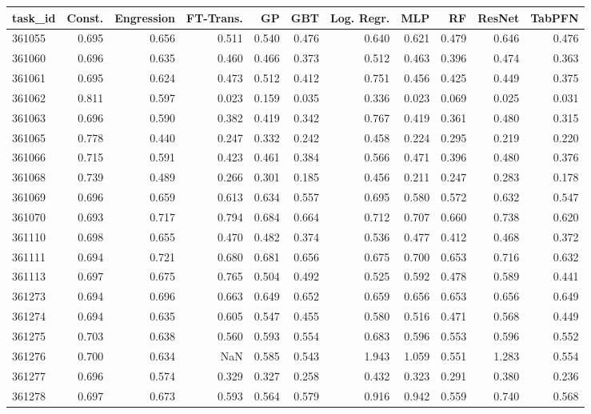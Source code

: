 \begin{tabular}{lrrrrrrrrrr}
\toprule
task\_id & Const. & Engression & FT-Trans. & GP & GBT & Log. Regr. & MLP & RF & ResNet & TabPFN \\
\midrule
361055 & 0.695 & 0.656 & 0.511 & 0.540 & 0.476 & 0.640 & 0.621 & 0.479 & 0.646 & 0.476 \\
361060 & 0.696 & 0.635 & 0.460 & 0.466 & 0.373 & 0.512 & 0.463 & 0.396 & 0.474 & 0.363 \\
361061 & 0.695 & 0.624 & 0.473 & 0.512 & 0.412 & 0.751 & 0.456 & 0.425 & 0.449 & 0.375 \\
361062 & 0.811 & 0.597 & 0.023 & 0.159 & 0.035 & 0.336 & 0.023 & 0.069 & 0.025 & 0.031 \\
361063 & 0.696 & 0.590 & 0.382 & 0.419 & 0.342 & 0.767 & 0.419 & 0.361 & 0.480 & 0.315 \\
361065 & 0.778 & 0.440 & 0.247 & 0.332 & 0.242 & 0.458 & 0.224 & 0.295 & 0.219 & 0.220 \\
361066 & 0.715 & 0.591 & 0.423 & 0.461 & 0.384 & 0.566 & 0.471 & 0.396 & 0.480 & 0.376 \\
361068 & 0.739 & 0.489 & 0.266 & 0.301 & 0.185 & 0.456 & 0.211 & 0.247 & 0.283 & 0.178 \\
361069 & 0.696 & 0.659 & 0.613 & 0.634 & 0.557 & 0.695 & 0.580 & 0.572 & 0.632 & 0.547 \\
361070 & 0.693 & 0.717 & 0.794 & 0.684 & 0.664 & 0.712 & 0.707 & 0.660 & 0.738 & 0.620 \\
361110 & 0.698 & 0.655 & 0.470 & 0.482 & 0.374 & 0.536 & 0.477 & 0.412 & 0.468 & 0.372 \\
361111 & 0.694 & 0.721 & 0.680 & 0.681 & 0.656 & 0.675 & 0.700 & 0.653 & 0.716 & 0.632 \\
361113 & 0.697 & 0.675 & 0.765 & 0.504 & 0.492 & 0.525 & 0.592 & 0.478 & 0.589 & 0.441 \\
361273 & 0.694 & 0.696 & 0.663 & 0.649 & 0.652 & 0.659 & 0.656 & 0.653 & 0.656 & 0.649 \\
361274 & 0.694 & 0.635 & 0.605 & 0.547 & 0.455 & 0.580 & 0.516 & 0.471 & 0.568 & 0.449 \\
361275 & 0.703 & 0.638 & 0.560 & 0.593 & 0.554 & 0.683 & 0.596 & 0.553 & 0.596 & 0.552 \\
361276 & 0.700 & 0.634 & NaN & 0.585 & 0.543 & 1.943 & 1.059 & 0.551 & 1.283 & 0.554 \\
361277 & 0.696 & 0.574 & 0.329 & 0.327 & 0.258 & 0.432 & 0.323 & 0.291 & 0.380 & 0.236 \\
361278 & 0.697 & 0.673 & 0.593 & 0.564 & 0.579 & 0.916 & 0.942 & 0.559 & 0.740 & 0.568 \\

\end{tabular}
